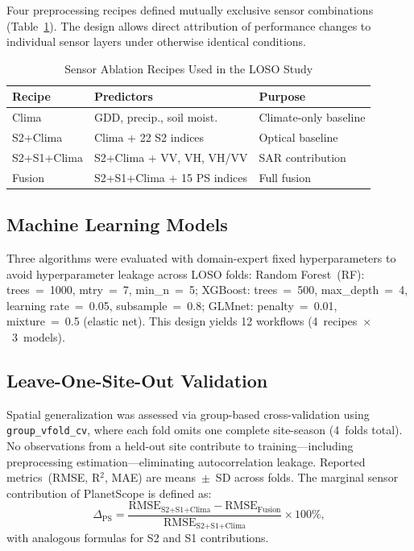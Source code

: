 \documentclass[lettersize,journal]{IEEEtran}
\begin{document}
Four preprocessing recipes defined mutually exclusive sensor combinations
(Table~\ref{tab:recipes}). The design allows direct attribution of performance
changes to individual sensor layers under otherwise identical conditions.

\begin{table}[!t]
\caption{Sensor Ablation Recipes Used in the LOSO Study\label{tab:recipes}}
\centering
\footnotesize
\begin{tabular}{lll}
\toprule
\textbf{Recipe} & \textbf{Predictors} & \textbf{Purpose} \\
\midrule
Clima        & GDD, precip., soil moist.     & Climate-only baseline \\
S2+Clima     & Clima + 22 S2 indices         & Optical baseline \\
S2+S1+Clima  & S2+Clima + VV, VH, VH/VV     & SAR contribution \\
Fusion       & S2+S1+Clima + 15 PS indices   & Full fusion \\
\bottomrule
\end{tabular}
\end{table}

\subsection{Machine Learning Models}

Three algorithms were evaluated with domain-expert fixed hyperparameters
to avoid hyperparameter leakage across LOSO folds:
Random Forest~(RF): trees~=~1000, mtry~=~7, min\_n~=~5;
XGBoost: trees~=~500, max\_depth~=~4, learning rate~=~0.05, subsample~=~0.8;
GLMnet: penalty~=~0.01, mixture~=~0.5 (elastic net).
This design yields 12 workflows (4~recipes~$\times$~3~models).

\subsection{Leave-One-Site-Out Validation}

Spatial generalization was assessed via group-based cross-validation using
\texttt{group\_vfold\_cv}, where each fold omits one complete site-season
(4~folds total). No observations from a held-out site contribute to
training---including preprocessing estimation---eliminating autocorrelation
leakage. Reported metrics~(RMSE, R$^2$, MAE) are means~$\pm$~SD across
folds. The marginal sensor contribution of PlanetScope is defined as:
%
\begin{equation}
\Delta_{\text{PS}} = \frac{\text{RMSE}_{\text{S2+S1+Clima}} -
  \text{RMSE}_{\text{Fusion}}}{\text{RMSE}_{\text{S2+S1+Clima}}}
  \times 100\%,
\label{eq:delta}
\end{equation}
%
with analogous formulas for S2 and S1 contributions.
\end{document}
